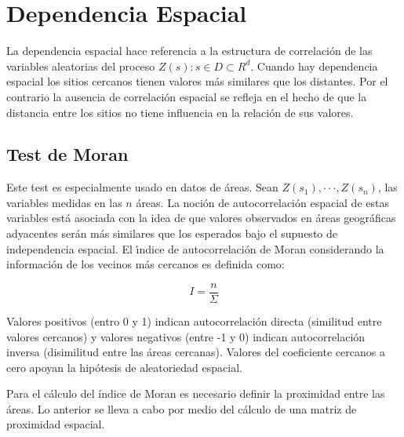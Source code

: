 \section{Dependencia Espacial}

La dependencia espacial hace referencia a la estructura de correlación de las variables aleatorias del proceso
${Z(s) : s \in D \subset R^d }$. Cuando hay dependencia espacial los sitios
cercanos tienen valores más similares que los distantes. Por el contrario la ausencia de correlación espacial se refleja en el hecho de que la distancia entre los sitios no tiene influencia
en la relación de sus valores. \cite{giraldo}

\subsection{Test de Moran}

Este test es especialmente usado en datos de áreas. Sean $Z(s_1 ), · · · , Z(s_n)$, las variables medidas en las $n$ áreas. La noción de autocorrelación espacial de estas variables está asociada con la idea de que valores observados en áreas geográficas adyacentes serán más similares que los esperados bajo el supuesto de independencia espacial. El ı́ndice de autocorrelación de Moran considerando la información de los vecinos más cercanos es definida
como:

$$ I = \frac{n}{\Sigma}$$

Valores positivos (entro 0 y 1) indican autocorrelación directa (similitud entre valores cercanos) y valores negativos (entre -1 y 0) indican autocorrelación inversa (disimilitud entre las áreas cercanas). Valores del coeficiente cercanos a cero apoyan la hipótesis de aleatoriedad espacial.

Para el cálculo del índice de Moran es necesario definir la proximidad entre las áreas. Lo anterior se lleva a cabo por medio del cálculo de una matriz de proximidad espacial. 







